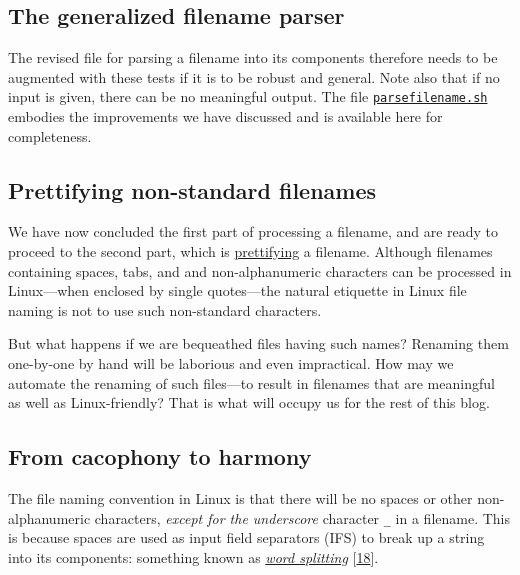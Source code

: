 \documentclass[
  a4paper,
]{article}
\begin{document}
\hypertarget{the-generalized-filename-parser}{%
\subsection{The generalized filename
parser}\label{the-generalized-filename-parser}}

The revised file for parsing a filename into its components therefore
needs to be augmented with these tests if it is to be robust and
general. Note also that if no input is given, there can be no meaningful
output. The file
\href{scripts/parsefilename.sh}{\texttt{parsefilename.sh}} embodies the
improvements we have discussed and is available here for completeness.

\hypertarget{prettifying-non-standard-filenames}{%
\subsection{Prettifying non-standard
filenames}\label{prettifying-non-standard-filenames}}

We have now concluded the first part of processing a filename, and are
ready to proceed to the second part, which is
\href{https://www.thefreedictionary.com/prettifying}{prettifying} a
filename. Although filenames containing spaces, tabs, and and
non-alphanumeric characters can be processed in Linux---when enclosed by
single quotes---the natural etiquette in Linux file naming is not to use
such non-standard characters.

But what happens if we are bequeathed files having such names? Renaming
them one-by-one by hand will be laborious and even impractical. How may
we automate the renaming of such files---to result in filenames that are
meaningful as well as Linux-friendly? That is what will occupy us for
the rest of this blog.

\hypertarget{from-cacophony-to-harmony}{%
\subsection{From cacophony to harmony}\label{from-cacophony-to-harmony}}

The file naming convention in Linux is that there will be no spaces or
other non-alphanumeric characters, \emph{except for the underscore}
character \texttt{\_} in a filename. This is because spaces are used as
input field separators (IFS) to break up a string into its components:
something known as
\href{https://mywiki.wooledge.org/WordSplitting?highlight=\%28spaces\%29\%7C\%28word\%29\%7C\%28splitting\%29}{\emph{word
splitting}} {[}\protect\hyperlink{ref-wordsplitting}{18}{]}.
\end{document}
